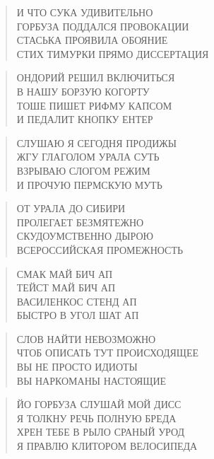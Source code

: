 \poemtitle{***}
\begin{verse}
И ЧТО СУКА УДИВИТЕЛЬНО\\
ГОРБУЗА ПОДДАЛСЯ ПРОВОКАЦИИ\\
СТАСЬКА ПРОЯВИЛА ОБОЯНИЕ\\
СТИХ ТИМУРКИ ПРЯМО ДИССЕРТАЦИЯ
\end{verse}

\poemtitle{***}
\begin{verse}
ОНДОРИЙ РЕШИЛ ВКЛЮЧИТЬСЯ\\
В НАШУ БОРЗУЮ КОГОРТУ\\
ТОШЕ ПИШЕТ РИФМУ КАПСОМ\\
И ПЕДАЛИТ  КНОПКУ ЕНТЕР
\end{verse}

\poemtitle{***}
\begin{verse}
СЛУШАЮ Я СЕГОДНЯ ПРОДИЖЫ\\
ЖГУ ГЛАГОЛОМ УРАЛА СУТЬ\\
ВЗРЫВАЮ СЛОГОМ РЕЖИМ\\
И ПРОЧУЮ ПЕРМСКУЮ МУТЬ
\end{verse}

\poemtitle{***}
\begin{verse}
ОТ УРАЛА ДО СИБИРИ\\
ПРОЛЕГАЕТ БЕЗМЯТЕЖНО\\
СКУДОУМСТВЕННО ДЫРОЮ\\
ВСЕРОССИЙСКАЯ ПРОМЕЖНОСТЬ
\end{verse}

\poemtitle{***}
\begin{verse}
СМАК МАЙ БИЧ АП\\
ТЕЙСТ МАЙ БИЧ АП\\
ВАСИЛЕНКОС СТЕНД АП\\
БЫСТРО В УГОЛ ШАТ АП
\end{verse}

\poemtitle{***}
\begin{verse}
СЛОВ НАЙТИ НЕВОЗМОЖНО\\
ЧТОБ ОПИСАТЬ ТУТ ПРОИСХОДЯЩЕЕ\\
ВЫ НЕ ПРОСТО ИДИОТЫ\\
ВЫ НАРКОМАНЫ НАСТОЯЩИЕ
\end{verse}

\poemtitle{***}
\begin{verse}
ЙО ГОРБУЗА СЛУШАЙ МОЙ ДИСС\\
Я ТОЛКНУ РЕЧЬ ПОЛНУЮ БРЕДА\\
ХРЕН ТЕБЕ В РЫЛО СРАНЫЙ УРОД\\
Я ПРАВЛЮ КЛИТОРОМ ВЕЛОСИПЕДА
\end{verse}

